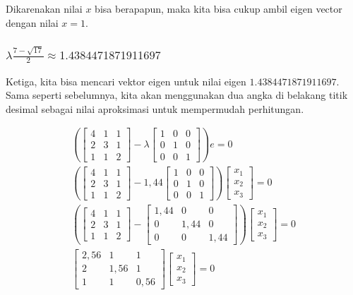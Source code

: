 \documentclass{article}
\begin{document}
Dikarenakan nilai $x$ bisa berapapun, maka kita bisa cukup ambil eigen vector dengan nilai $x=1$.

\subsubsection{$\lambda \frac{7-\sqrt{17}}{2} \approx 1.4384471871911697$}
Ketiga, kita bisa mencari vektor eigen untuk nilai eigen $1.4384471871911697$. Sama seperti sebelumnya, kita akan menggunakan dua angka di belakang titik desimal sebagai nilai aproksimasi untuk mempermudah perhitungan.

\begin{align*}
    \left(
\begin{bmatrix}
4 & 1 & 1\\
2 & 3 & 1\\
1 & 1 & 2
\end{bmatrix}
- \lambda
\begin{bmatrix}
1 & 0 & 0\\
0 & 1 & 0\\
0 & 0 & 1
\end{bmatrix}
    \right)
    e = 0\\
        \left(
\begin{bmatrix}
4 & 1 & 1\\
2 & 3 & 1\\
1 & 1 & 2
\end{bmatrix}
- 1,44
\begin{bmatrix}
1 & 0 & 0\\
0 & 1 & 0\\
0 & 0 & 1
\end{bmatrix}
    \right)
    \begin{bmatrix}
        x_1\\x_2\\x_3
    \end{bmatrix} = 0\\
            \left(
\begin{bmatrix}
4 & 1 & 1\\
2 & 3 & 1\\
1 & 1 & 2
\end{bmatrix}
-
\begin{bmatrix}
1,44 & 0 & 0\\
0 & 1,44 & 0\\
0 & 0 & 1,44
\end{bmatrix}
    \right)
    \begin{bmatrix}
        x_1\\x_2\\x_3
    \end{bmatrix} = 0\\
\begin{bmatrix}
2,56 & 1 & 1\\
2 & 1,56 & 1\\
1 & 1 & 0,56
\end{bmatrix}
    \begin{bmatrix}
        x_1\\x_2\\x_3
    \end{bmatrix} = 0
\end{align*}
\end{document}
